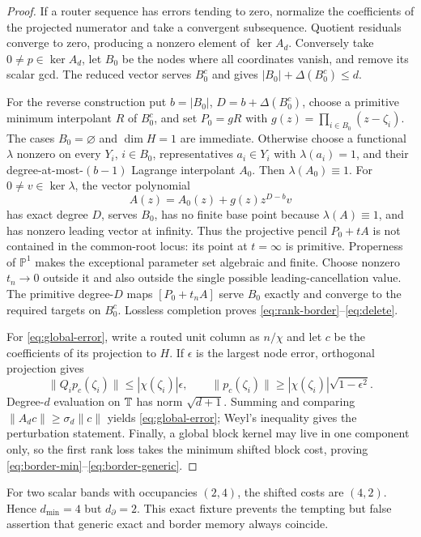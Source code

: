 \documentclass[11pt]{article}
\theoremstyle{definition}\newtheorem{definition}[theorem]{Definition}\newtheorem{example}[theorem]{Example}
\theoremstyle{remark}\newtheorem{remark}[theorem]{Remark}\newtheorem{limitation}[theorem]{Limitation}
\newcommand{\PP}{\mathbb P}\newcommand{\rank}{\operatorname{rank}}
\begin{document}
\begin{proof}
If a router sequence has errors tending to zero, normalize the coefficients of
the projected numerator and take a convergent subsequence.  Quotient residuals
converge to zero, producing a nonzero element of $\ker A_d$.  Conversely take
$0\ne p\in\ker A_d$, let $B_0$ be the nodes where all coordinates vanish, and
remove its scalar gcd.  The reduced vector serves $B_0^c$ and gives
$|B_0|+\Delta(B_0^c)\le d$.

For the reverse construction put $b=|B_0|$,
$D=b+\Delta(B_0^c)$, choose a primitive minimum interpolant $R$ of $B_0^c$,
and set $P_0=gR$ with
$g(z)=\prod_{i\in B_0}(z-\zeta_i)$.  The cases $B_0=\varnothing$ and
$\dim H=1$ are immediate.  Otherwise choose a functional $\lambda$ nonzero
on every $Y_i$, $i\in B_0$, representatives $a_i\in Y_i$ with
$\lambda(a_i)=1$, and their degree-at-most-$(b-1)$ Lagrange interpolant
$A_0$.  Then $\lambda(A_0)\equiv1$.  For $0\ne v\in\ker\lambda$, the vector
polynomial
\[
                         A(z)=A_0(z)+g(z)z^{D-b}v
\]
has exact degree $D$, serves $B_0$, has no finite base point because
$\lambda(A)\equiv1$, and has nonzero leading vector at infinity.  Thus the
projective pencil $P_0+tA$ is not contained in the common-root locus: its
point at $t=\infty$ is primitive.  Properness of $\PP^1$ makes the exceptional
parameter set algebraic and finite.  Choose nonzero $t_n\to0$ outside it and
also outside the single possible leading-cancellation value.  The primitive
degree-$D$ maps $[P_0+t_nA]$ serve $B_0$ exactly and converge to the required
targets on $B_0^c$.  Lossless completion proves
\eqref{eq:rank-border}--\eqref{eq:delete}.

For \eqref{eq:global-error}, write a routed unit column as $n/\chi$ and let
$c$ be the coefficients of its projection to $H$.  If $\epsilon$ is the
largest node error, orthogonal projection gives
\[
 \|Q_i p_c(\zeta_i)\|\le|\chi(\zeta_i)|\epsilon,
 \qquad
 \|p_c(\zeta_i)\|\ge|\chi(\zeta_i)|\sqrt{1-\epsilon^2}.
\]
Degree-$d$ evaluation on $\mathbb T$ has norm $\sqrt{d+1}$.  Summing and comparing
$\|A_dc\|\ge\sigma_d\|c\|$ yields \eqref{eq:global-error}; Weyl's inequality
gives the perturbation statement.  Finally, a global block kernel may live in
one component only, so the first rank loss takes the minimum shifted block
cost, proving \eqref{eq:border-min}--\eqref{eq:border-generic}.
\end{proof}

For two scalar bands with occupancies $(2,4)$, the shifted costs are $(4,2)$.
Hence $d_{\min}=4$ but $d_\partial=2$.  This exact fixture prevents the tempting
but false assertion that generic exact and border memory always coincide.
\end{document}

